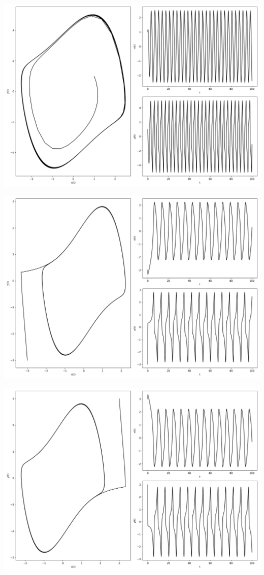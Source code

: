 \documentclass[12pt,a4paper]{jsarticle}
\makeatletter
\def\figcaption{\def\@captype{figure}\caption}
\makeatother
\begin{document}
\figcaption{$x_0=1,00, y_0=1.00, \mu=1.00, \omega=0.00, T = 100, N = 1000$}
\includegraphics[scale=0.33]{x1,0y1,0mu1,0omega2,0t1,00e+02n1,00e+03.png}
\figcaption{$x_0=1,00, y_0=1.00, \mu=1.00, \omega=2.00, T = 100, N = 1000$}
\includegraphics[scale=0.33]{x-3,0y-3,0mu1,0omega1,0t1,00e+02n1,00e+03.png}
\figcaption{$x_0=-3.00, y_0=-3.00, \mu=1,00, \omega=1.00, T = 100, N = 1000$}
\includegraphics[scale=0.33]{x3,0y3,0mu1,0omega1,0t1,00e+02n1,00e+03.png}
\end{document}

